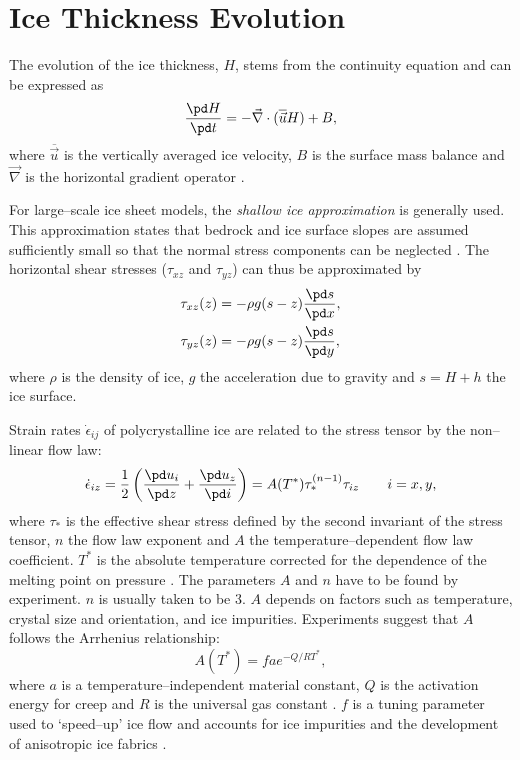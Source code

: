 \section{Ice Thickness Evolution}
\label{sc:glide_thickness_evolution}
The evolution of the ice thickness, $H$, stems from the continuity equation and can be expressed as
\begin{equation}
  \label{kin.eq.ice_thickness}
  \frac{\pd H}{\pd t} = -\vec\nabla\cdot(\overline{\vec{u}} H) + B,
\end{equation}
where $\overline{\vec{u}}$ is the vertically averaged ice velocity, $B$ is the surface mass balance and $\vec\nabla$ is the horizontal gradient operator \citep{Payne1997}. 

For large--scale ice sheet models, the \emph{shallow ice approximation} is generally used. This approximation states that bedrock and ice surface slopes are assumed sufficiently small so that the normal stress components can be neglected \citep{Hutter1983}. The horizontal shear stresses ($\tau_{xz}$ and $\tau_{yz}$) can thus be approximated by
\begin{equation}
  \label{kin.eq.horiz_shear}
  \begin{split}
    \tau_{xz}(z)&=-\rho g(s-z)\frac{\pd s}{\pd x},\\
    \tau_{yz}(z)&=-\rho g(s-z)\frac{\pd s}{\pd y},
  \end{split}
\end{equation}
where $\rho$ is the density of ice, $g$ the acceleration due to gravity and $s=H+h$ the ice surface.

Strain rates $\dot{\epsilon}_{ij}$ of polycrystalline ice are related to the stress tensor by the non--linear flow law:
\begin{equation}
  \label{kin.eq.flowlaw}
  \dot{\epsilon}_{iz}=\frac12\left(\frac{\pd u_i}{\pd z}+\frac{\pd u_z}{\pd i}\right)=A(T^\ast)\tau_\ast^{(n-1)}\tau_{iz}\qquad i=x,y,
\end{equation}
where $\tau_\ast$ is the effective shear stress defined by the second invariant of the stress tensor, $n$ the flow law exponent and $A$ the temperature--dependent flow law coefficient. $T^\ast$ is the absolute temperature corrected for the dependence of the melting point on pressure \cite[$T^\ast=T+8.7\cdot10^{-4}(H+h-z)$, $T$ in Kelvin,][]{Huybrechts1986}. The parameters $A$ and $n$ have to be found by experiment. $n$ is usually taken to be 3. $A$ depends on factors such as temperature, crystal size and orientation, and ice impurities. Experiments suggest that $A$ follows the Arrhenius relationship:
\begin{equation}
  \label{kin.eq.arrhenius}
  A(T^\ast)=fae^{-Q/RT^\ast},
\end{equation}where $a$ is a temperature--independent material constant, $Q$ is the activation energy for creep and $R$ is the universal gas constant \citep{Paterson1994}. $f$ is a tuning parameter used to `speed--up' ice flow and accounts for ice impurities and the development of anisotropic ice fabrics \citep{Payne1999,Tarasov1999,Tarasov2000,Peltier2000}.


